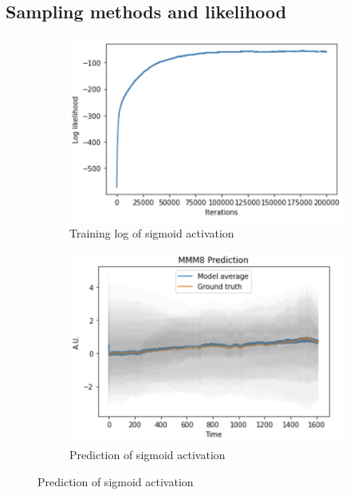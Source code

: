 \documentclass{article}
\begin{document}
\subsection{Sampling methods and likelihood}


\begin{figure}[h]
    \centering
    \begin{subfigure}[b]{0.5\textwidth}
        \centering
        \includegraphics[width=\textwidth]{../img/training_Langevin_200000_iter.png}
        \caption{Training log of sigmoid activation}
    \end{subfigure}\hfill
    \begin{subfigure}[b]{0.5\textwidth}
        \centering
        \includegraphics[trim={0 0 0 0.7cm}, clip, width=\textwidth]{../img/prediction_Langevin_200000_iter.png}
        \caption{Prediction of sigmoid activation}

\end{subfigure}
\end{figure}
\end{document}
